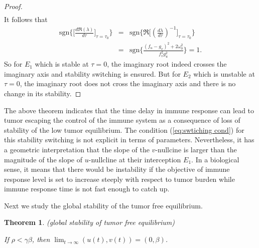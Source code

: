 \documentclass{aims}
\newtheorem{theorem}{Theorem}[section]
\theoremstyle{definition}
\begin{document}
\begin{proof}
\begin{eqnarray*}
\end{eqnarray*}
 It follows that 
\begin{eqnarray*}
\text{sgn}\bigg\{\bigg[\frac{d\Re(\lambda)}{d\tau}\bigg]_{\tau=\tau_{0}}\bigg\} & = & \text{sgn}\bigg\{\Re\bigg[(\frac{d\lambda}{d\tau})^{-1}\bigg]_{\tau=\tau_{0}}\bigg\}\\
 & = & \text{sgn}\bigg\{\frac{(f_{u}-g_{v})^{2}+2\omega_{0}^{2}}{f_{v}^{2}g_{u}^{2}}\bigg\}=1.
\end{eqnarray*}
So for $E_1$ which is stable at $\tau=0$, the imaginary root indeed crosses the imaginary axis and stability switching is ensured. But for $E_2$ which is unstable at $\tau=0$, the imaginary root does not cross the imaginary axis and there is no change in its stability.  
\end{proof}

The above theorem indicates that the time delay in immune response can lead to tumor escaping the control of the immune system as a consequence of loss of stability of the low tumor equilibrium.  The condition (\ref{eq:swtiching cond}) for this stability switching is not explicit in terms of parameters. Nevertheless, it has a geometric interpretation that the slope of the $v$-nullcine is larger than the magnitude of the slope of $u$-nullcline at their interception $E_{1}$. In a biological sense, it means that there would be instability if the objective of immune response level is set to increase steeply with respect to tumor burden while immune response time is not fast enough to catch up.

Next we study the global stability of the tumor free equilibrium. 
\begin{theorem}
\textup{(global stability of tumor free equilibrium)} 

If $\rho<\gamma\beta$, then $\lim_{t\to\infty}(u(t),v(t))=(0,\beta)$. 
\end{theorem}
\end{document}

